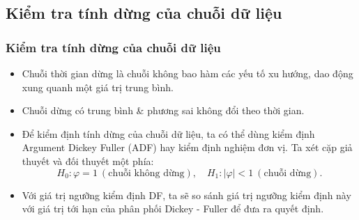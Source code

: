 \subsection{Kiểm tra tính dừng của chuỗi dữ liệu}
\begin{frame}
\frametitle{Kiểm tra tính dừng của chuỗi dữ liệu}
\begin{itemize}
\item Chuỗi thời gian dừng là chuỗi không bao hàm các yếu tố xu hướng, dao động xung quanh một giá trị trung bình.
\item Chuỗi dừng có trung bình \& phương sai không đổi theo thời gian.
\item Để kiểm định tính dừng của chuỗi dữ liệu, ta có thể dùng kiểm định Argument Dickey Fuller (ADF) hay kiểm định nghiệm đơn vị.
Ta xét cặp giả thuyết và đối thuyết một phía:
\[H_0: \varphi=1~(\text{chuỗi không dừng}),\quad H_1: |\varphi|<1~(\text{chuỗi dừng}).\]
\item Với giá trị ngưỡng kiểm định DF, ta sẽ so sánh giá trị ngưỡng kiểm định này với giá trị tới hạn của phân phối Dickey - Fuller để đưa ra quyết định.
\end{itemize}

\end{frame}
